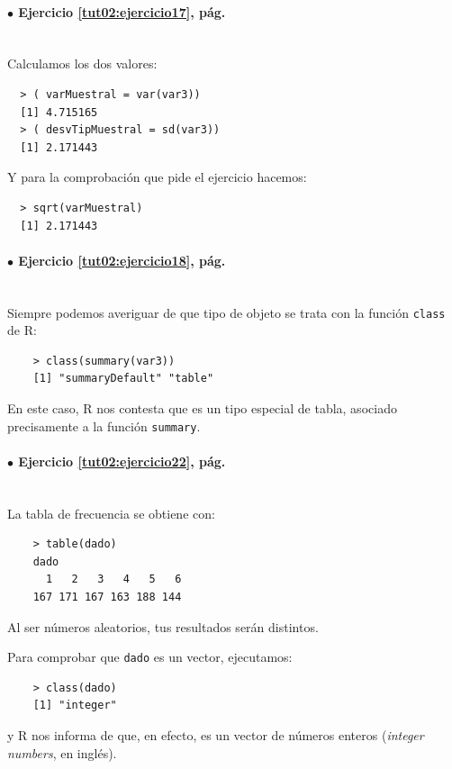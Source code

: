 \documentclass[10pt,a4paper]{article}\usepackage[]{graphicx}\usepackage[]{color}
\newcounter {cont01}
\begin{document}
\paragraph{\bf $\bullet$ Ejercicio \ref{tut02:ejercicio17},  pág. \pageref{tut02:ejercicio17}}
\label{tut02:ejercicio17:sol}\quad\\
Calculamos los dos valores:
\begin{verbatim}
  > ( varMuestral = var(var3))
  [1] 4.715165
  > ( desvTipMuestral = sd(var3))
  [1] 2.171443
\end{verbatim}
Y para la comprobación que pide el ejercicio hacemos:
\begin{verbatim}
  > sqrt(varMuestral)
  [1] 2.171443
\end{verbatim}

\paragraph{\bf $\bullet$ Ejercicio \ref{tut02:ejercicio18},  pág. \pageref{tut02:ejercicio18}}
\label{tut02:ejercicio18:sol}\quad\\
Siempre podemos averiguar de que tipo de objeto se trata con la función {\tt class} de R:
\begin{verbatim}
    > class(summary(var3))
    [1] "summaryDefault" "table"
\end{verbatim}
En este caso, R nos contesta que es un tipo especial de tabla, asociado precisamente a la función {\tt summary}.


\paragraph{\bf $\bullet$ Ejercicio \ref{tut02:ejercicio22},  pág. \pageref{tut02:ejercicio22}}
\label{tut02:ejercicio22:sol}\quad\\

La tabla de frecuencia se obtiene con:
\begin{verbatim}
    > table(dado)
    dado
      1   2   3   4   5   6
    167 171 167 163 188 144
\end{verbatim}
Al ser números aleatorios, tus resultados serán distintos.

Para comprobar que {\tt dado} es un vector, ejecutamos:
\begin{verbatim}
    > class(dado)
    [1] "integer"
\end{verbatim}
y R nos informa de que, en efecto, es un vector de números enteros ({\em integer numbers}, en  inglés).
\end{document}
